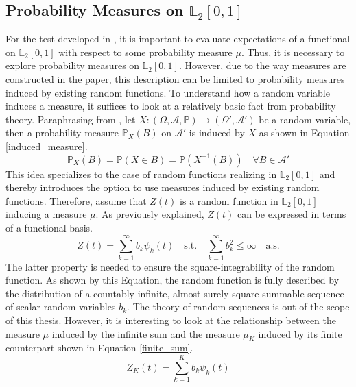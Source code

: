 \documentclass[12pt, a4paper]{article}
\theoremstyle{MAstyle} \newtheorem{assumption}{Assumption}[section]
\theoremstyle{MAstyle} \newtheorem{definition}{Definition}[section]
\theoremstyle{MAstyle} \newtheorem{theorem}{Theorem}[section]
\begin{document}
		\subsection{Probability Measures on $\mathbb{L}_2[0,1]$}\label{prob_measures_l2}
			For the test developed in \cite{bugni_permutation_2021}, it is important to evaluate expectations of a functional on $\mathbb{L}_2[0,1]$ with respect to some probability measure $\mu$. Thus, it is necessary to explore probability measures on $\mathbb{L}_2[0,1]$. However, due to the way measures are constructed in the paper, this description can be limited to probability measures induced by existing random functions. 
			To understand how a random variable induces a measure, it suffices to look at a relatively basic fact from probability theory. Paraphrasing from \cite{bauer_probability_2011}, let $X:\left(\Omega, \mathcal{A}, \mathbb{P}\right) \rightarrow \left(\Omega', \mathcal{A}'\right)$ be a random variable, then a probability measure $\mathbb{P}_X(B)$ on $\mathcal{A}'$ is induced by $X$ as shown in Equation \ref{induced_measure}.
			\begin{equation}\label{induced_measure}
				\mathbb{P}_X(B) = \mathbb{P}(X \in B) = \mathbb{P}(X^{-1}(B)) \quad \forall B \in \mathcal{A}'
			\end{equation}
			This idea specializes to the case of random functions realizing in $\mathbb{L}_2[0,1]$ and thereby introduces the option to use measures induced by existing random functions.
			Therefore, assume that $Z(t)$ is a random function in $\mathbb{L}_2[0,1]$ inducing a measure $\mu$. As previously explained, $Z(t)$ can be expressed in terms of a functional basis.
			\begin{equation}
				Z(t) = \sum_{k = 1}^{\infty} b_k \psi_k(t) \quad \text{s.t.} \quad \sum_{k = 1}^{\infty} b_k^2 \leq \infty \quad \text{a.s.}
			\end{equation}
			The latter property is needed to ensure the square-integrability of the random function. As shown by this Equation, the random function is fully described by the distribution of a countably infinite, almost surely square-summable sequence of scalar random variables $b_k$. The theory of random sequences is out of the scope of this thesis. However, it is interesting to look at the relationship between the measure $\mu$ induced by the infinite sum and the measure $\mu_K$ induced by its finite counterpart shown in Equation \ref{finite_sum}.
			\begin{equation}\label{finite_sum}
				Z_K(t) = \sum_{k = 1}^{K} b_k \psi_k(t)
			\end{equation}
\end{document}
